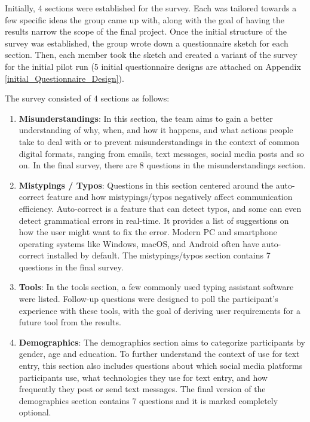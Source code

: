 \documentclass[acmsmall,screen,authorversion,nonacm]{acmart}
\begin{document}
Initially, 4 sections were established for the survey. Each was tailored towards a few specific ideas the group came up with, along with the goal of having the results narrow the scope of the final project. Once the initial structure of the survey was established, the group wrote down a questionnaire sketch for each section. Then, each member took the sketch and created a variant of the survey for the initial pilot run (5 initial questionnaire designs are attached on Appendix \ref{initial_Questionnaire_Design}).

The survey consisted of 4 sections as follows:
\begin{enumerate}
    \item \textbf{Misunderstandings}: In this section, the team aims to gain a better understanding of why, when, and how it happens, and what actions people take to deal with or to prevent misunderstandings in the context of common digital formats, ranging from emails, text messages, social media posts and so on. In the final survey, there are 8 questions in the misunderstandings section. 

    \item \textbf{Mistypings / Typos}: Questions in this section centered around the auto-correct feature and how mistypings/typos negatively affect communication efficiency. Auto-correct is a feature that can detect typos, and some can even detect grammatical errors in real-time. It provides a list of suggestions on how the user might want to fix the error. Modern PC and smartphone operating systems like Windows, macOS, and Android often have auto-correct installed by default. The mistypings/typos section contains 7 questions in the final survey. 
    
    \item \textbf{Tools}: In the tools section, a few commonly used typing assistant software were listed. Follow-up questions were designed to poll the participant's experience with these tools, with the goal of deriving user requirements for a future tool from the results. 
    
    \item \textbf{Demographics}: The demographics section aims to categorize participants by gender, age and education. To further understand the context of use for text entry, this section also includes questions about which social media platforms participants use, what technologies they use for text entry, and how frequently they post or send text messages. The final version of the demographics section contains 7 questions and it is marked completely optional. 
\end{enumerate}
\end{document}
